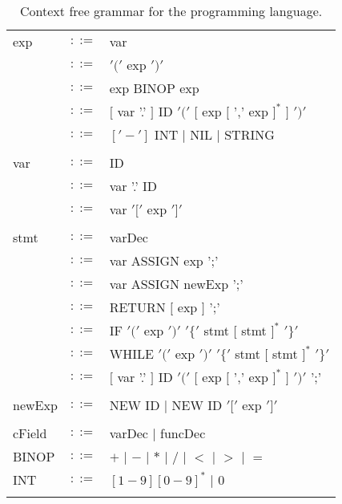 \documentclass{article}
\begin{document}
\begin{table}[h]
\begin{tabular}{ l c l }
exp      & $::=$ & var                                                            \\
         & $::=$ & $'('$ exp $')'$                                                \\
         & $::=$ & exp BINOP exp                                                  \\
         & $::=$ & $[$ var '.' $]$ ID $'('$ $[$ exp $[$ ',' exp $]^{*}$ $]$ $')'$ \\
         & $::=$ & $['-']$ INT $|$ NIL $|$ STRING                                 \\
\\
var      & $::=$ & ID                  \\
         & $::=$ & var '.' ID          \\
         & $::=$ & var $'['$ exp $']'$ \\
\\  
stmt     & $::=$ & varDec                                                             \\
         & $::=$ & var ASSIGN exp ';'                                                 \\
         & $::=$ & var ASSIGN newExp ';'                                              \\
         & $::=$ & RETURN $[$ exp $]$ ';'                                             \\
         & $::=$ & IF $'('$ exp $')'$ $'\{'$ stmt $[$ stmt $]^{*}$ $'\}'$             \\
         & $::=$ & WHILE $'('$ exp $')'$ $'\{'$ stmt $[$ stmt $]^{*}$ $'\}'$          \\
         & $::=$ & $[$ var '.' $]$ ID $'('$ $[$ exp $[$ ',' exp $]^{*}$ $]$ $')'$ ';' \\
\\
newExp   & $::=$ & NEW ID $|$ NEW ID $'['$ exp $']'$ \\
\\
cField   & $::=$ & varDec $|$ funcDec \\
BINOP    & $::=$ & $+$ $|$ $-$ $|$ $*$ $|$ $/$ $|$ $<$ $|$ $>$ $|$ $=$ \\
INT      & $::=$ & $[1-9][0-9]^{*}$ $|$ $0$                            \\
\\
\end{tabular}
\caption{
Context free grammar for the \plname programming language.
\label{Table_CFG}}
\end{table}
\end{document}
